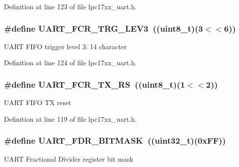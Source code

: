 \-Definition at line 123 of file lpc17xx\-\_\-uart.\-h.

\hypertarget{group___u_a_r_t___private___macros_ga9e6ef12c7a1f3514d6e30d7548ed3e46}{
\subsubsection[{\-U\-A\-R\-T\-\_\-\-F\-C\-R\-\_\-\-T\-R\-G\-\_\-\-L\-E\-V3}]{\setlength{\rightskip}{0pt plus 5cm}\#define {\bf \-U\-A\-R\-T\-\_\-\-F\-C\-R\-\_\-\-T\-R\-G\-\_\-\-L\-E\-V3}~((uint8\-\_\-t)(3$<$$<$6))}}\label{group___u_a_r_t___private___macros_ga9e6ef12c7a1f3514d6e30d7548ed3e46}
\-U\-A\-R\-T \-F\-I\-F\-O trigger level 3\-: 14 character 

\-Definition at line 124 of file lpc17xx\-\_\-uart.\-h.

\hypertarget{group___u_a_r_t___private___macros_ga1c1a83fcacf333309330eea460d8a6a6}{
\subsubsection[{\-U\-A\-R\-T\-\_\-\-F\-C\-R\-\_\-\-T\-X\-\_\-\-R\-S}]{\setlength{\rightskip}{0pt plus 5cm}\#define {\bf \-U\-A\-R\-T\-\_\-\-F\-C\-R\-\_\-\-T\-X\-\_\-\-R\-S}~((uint8\-\_\-t)(1$<$$<$2))}}\label{group___u_a_r_t___private___macros_ga1c1a83fcacf333309330eea460d8a6a6}
\-U\-A\-R\-T \-F\-I\-F\-O \-T\-X reset 

\-Definition at line 119 of file lpc17xx\-\_\-uart.\-h.

\hypertarget{group___u_a_r_t___private___macros_ga61a8f74c3fc22574793c6218b90fec50}{
\subsubsection[{\-U\-A\-R\-T\-\_\-\-F\-D\-R\-\_\-\-B\-I\-T\-M\-A\-S\-K}]{\setlength{\rightskip}{0pt plus 5cm}\#define {\bf \-U\-A\-R\-T\-\_\-\-F\-D\-R\-\_\-\-B\-I\-T\-M\-A\-S\-K}~((uint32\-\_\-t)(0x\-F\-F))}}\label{group___u_a_r_t___private___macros_ga61a8f74c3fc22574793c6218b90fec50}
\-U\-A\-R\-T \-Fractional \-Divider register bit mask 

